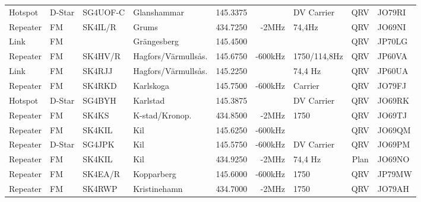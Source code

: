 \begin{landscape}
\begin{longtable}{llllrrlcl}
	Hotspot           & D-Star       & SG4UOF-C      & Glanshammar         &          145.3375 &                & DV Carrier      &       QRV       & JO79RI           \\
	Repeater          & FM           & SK4IL/R       & Grums               &          434.7250 &          -2MHz & 74,4Hz          &       QRV       & JO69NI           \\
	Link              & FM           &               & Grängesberg         &          145.4500 &                &                 &       QRV       & JP70LG           \\
	Repeater          & FM           & SK4HV/R       & Hagfors/Värmullsås. &          145.6750 &        -600kHz & 1750/114,8Hz    &       QRV       & JP60VA           \\
	Link              & FM           & SK4RJJ        & Hagfors/Värmullsås. &          145.2250 &                & 74,4 Hz         &       QRV       & JP60UA           \\
	Repeater          & FM           & SK4RKD        & Karlskoga           &          145.7500 &        -600kHz & Carrier         &       QRV       & JO79FJ           \\
	Hotspot           & D-Star       & SG4BYH        & Karlstad            &          145.3875 &                & DV Carrier      &       QRV       & JO69RK           \\
	Repeater          & FM           & SK4KS         & K-stad/Kronop.      &          434.8500 &          -2MHz & 1750            &       QRV       & JO69TJ           \\
	Repeater          & FM           & SK4KIL        & Kil                 &          145.6250 &        -600kHz &                 &       QRV       & JO69QM           \\
	Repeater          & D-Star       & SG4JPK        & Kil                 &          145.5750 &        -600kHz & DV Carrier      &       QRV       & JO69PM           \\
	Repeater          & FM           & SK4KIL        & Kil                 &          434.9250 &          -2MHz & 74,4 Hz         &      Plan       & JO69NO           \\
	Repeater          & FM           & SK4EA/R       & Kopparberg          &          145.6000 &        -600kHz & 1750            &       QRV       & JP79MW           \\
	Repeater          & FM           & SK4RWP        & Kristinehamn        &          434.7000 &          -2MHz & 1750            &       QRV       & JO79AH           \\

\end{longtable}
\end{landscape}
